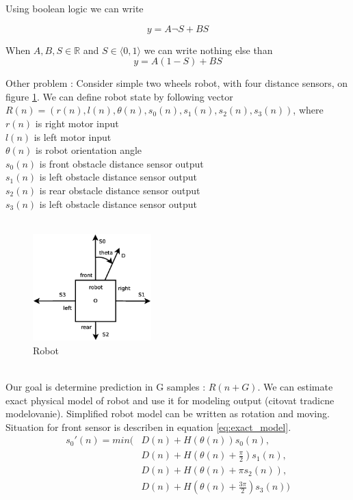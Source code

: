 \documentclass[times]{cpeauth}
\begin{document}
Using boolean logic we can write

\begin{equation}
\label{eq:boolean mux}
  y = A\neg S + BS
\end{equation}

When $A, B, S \in \mathbb{R}$ and $S \in \langle 0, 1 \rangle$ we can write nothing else than
\begin{equation}
\label{eq:fuzzy mux}
  y = A(1-S) + BS
\end{equation}

Other problem :
Consider simple two wheels robot, with four distance sensors, on figure \ref{img:robot}.
We can define robot state by following vector $R(n) = (r(n), l(n), \theta(n), s_0(n), s_1(n), s_2(n), s_3(n))$,
where \\
$r(n)$ is right motor input \\
$l(n)$ is left motor input \\
$\theta(n)$ is robot orientation angle \\
$s_0(n)$ is front obstacle distance sensor output \\
$s_1(n)$ is left obstacle distance sensor output \\
$s_2(n)$ is rear obstacle distance sensor output \\
$s_3(n)$ is left obstacle distance sensor output \\
\\
\begin{figure}[!ht]
\centering
\includegraphics[width=1.8in]{images/robot.eps}
\caption{Robot}
\label{img:robot}
\end{figure}
\\
Our goal is determine prediction in G samples : $R(n+G)$. We can estimate exact physical model of robot and use it for modeling output (citovat tradicne modelovanie).
Simplified robot model can be written as rotation and moving.
 Situation for front sensor is describen in equation \ref{eq:exact_model}.
\\
\begin{align}
\label{eq:exact_model}
	s_0'(n) = min ( &D(n) + H(\theta(n))s_0(n) , \\
			&D(n) + H(\theta(n) + \frac{\pi}{2})s_1(n) , \nonumber \\
			&D(n) + H(\theta(n) + \pi s_2(n)) , \nonumber \\
			&D(n) + H(\theta(n) + \frac{3\pi}{2})s_3(n)) \nonumber
\end{align}
\end{document}
